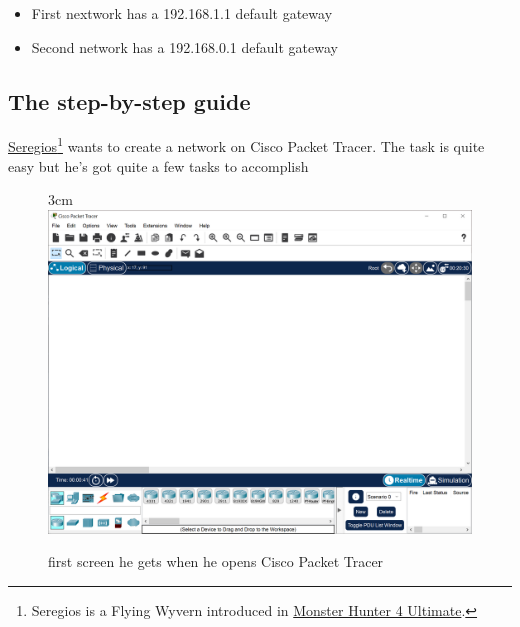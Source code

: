 \documentclass[a4paper,12pt]{article}
\begin{document}

\begin{itemize}
\item{First nextwork has a 192.168.1.1 default gateway}
\item{Second network has a 192.168.0.1 default gateway}
\end{itemize}

\clearpage

\subsection{The step-by-step guide}

\href{https://monsterhunter.fandom.com/wiki/Seregios}{Seregios}\footnote{\label{seregios}Seregios is a Flying Wyvern introduced in \href{https://monsterhunter.fandom.com/wiki/Monster_Hunter_4_Ultimate}{Monster Hunter 4 Ultimate}.} wants to create a network on Cisco Packet Tracer. The task is quite easy but he's got quite a few tasks to accomplish

\begin{figure}{3cm}
\centering
\includegraphics[width=13cm]{./step-by-step/0.PNG}
\caption{first screen he gets when he opens Cisco Packet Tracer}\label{wrap-fig:100}
\end{figure}
\end{document}
